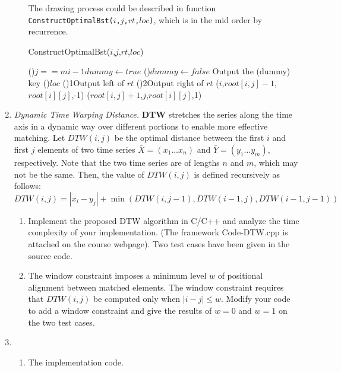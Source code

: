 \documentclass[12pt,a4paper]{article}
\makeatletter
\newtheorem*{solution}{Solution}
\theoremstyle{definition}
\renewenvironment{solution}[1][Solution] {\par\pushQED{\qed}\normalfont\topsep6\p@\@plus6\p@\relax\trivlist\item[\hskip\labelsep\bfseries#1\@addpunct{.}]\ignorespaces}{\popQED\endtrivlist\@endpefalse} \makeatother
\providecommand{\code}[2]{}
\makeatother
\begin{document}
\begin{enumerate}
\begin{enumerate}
			The drawing process could be described in function \texttt{ConstructOptimalBst($i$,$j$,$rt$,$loc$)}, which is in the mid order by recurrence.
			\begin{function}[h]
				\caption{ConstructOptimalBst($i$,$j$,$rt$,$loc$)}
				\BlankLine
				\lIf(){$j==m i-1$}{$dummy\leftarrow true$}
				\lElse(){$dummy\leftarrow false$}
				Output the (dummy) key\;
				\Switch(){$loc$}{
					\lCase(){1}{Output left of $rt$}
					\lCase(){2}{Output right of $rt$}
				}
				\ConstructOptimalBst($i$,$root[i,j]-1$,$root[i][j]$,-1)\;
				\ConstructOptimalBst($root[i,j]+1$,$j$,$root[i][j]$,1)\;
			\end{function}

		\end{enumerate}
		
		\item \textit{Dynamic Time Warping Distance.} \textbf{DTW} stretches the series along the time axis in a dynamic way over different
		portions to enable more effective matching. Let $D T W(i, j)$ be the optimal distance between the first $i$ and first $j$ elements of two time series $\bar{X}=\left(x_{1} \ldots x_{n}\right)$ and $\bar{Y}=\left(y_{1} \ldots y_{m}\right),$ respectively. Note that the two time series are of lengths $n$ and $m$, which may not be the same. Then, the value of $D T W(i, j)$ is defined recursively as follows:
		$$
		DTW(i, j)=\left|x_{i}- y_{j}\right|+\min(DTW(i, j-1), DTW(i-1, j), DTW(i-1, j-1))
		$$
		
		\begin{enumerate}
			\item Implement the proposed DTW algorithm in C/C++ and analyze the time complexity of your implementation. ({\color{blue}The framework Code-DTW.cpp is attached on the course webpage}). Two test cases have been given in the source code. 
			\item The window constraint imposes a minimum level $w$ of positional alignment between matched elements. The window constraint requires that $DTW(i, j)$ be computed only when $|i-j| \leq w$. Modify your code to add a window constraint and give the results of $ w=0 $ and $ w=1 $ on the two test cases. 
		\end{enumerate}
		\begin{solution}
			\begin{enumerate}
				\item The implementation code.
				\code{Code-DTW.cpp}{c++}


\end{enumerate}
\end{solution}
\end{enumerate}
\end{document}
